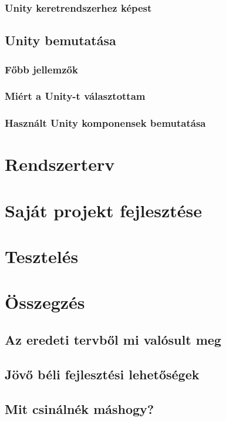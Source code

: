 \documentclass[
]{thesis-ekf}
\theoremstyle{definition}
\theoremstyle{remark}
\begin{document}
\subsection{Unity keretrendszerhez képest}
\section{Unity bemutatása} %

\subsection{Főbb jellemzők}
\subsection{Miért a Unity-t választottam}
\subsection{Használt Unity komponensek bemutatása}
\chapter{Rendszerterv}
\chapter{Saját projekt fejlesztése}
\chapter{Tesztelés}
\chapter{Összegzés}
\section{Az eredeti tervből mi valósult meg}
\section{Jövő béli fejlesztési lehetőségek}
\section{Mit csinálnék máshogy?}
\end{document}
